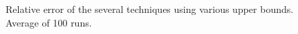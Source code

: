 \begin{figure}[htb]
{}

\caption{Relative error of the several techniques using various upper
  bounds. Average of 100 runs.} 
\label{fig:accuracy}
\end{figure}
   
